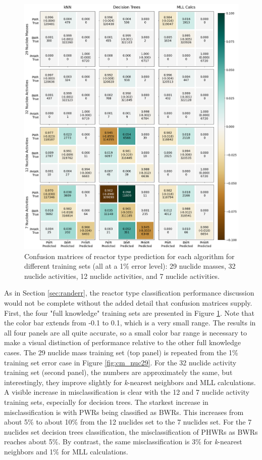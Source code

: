 \begin{figure}[!htbp]
  \centering
  \includegraphics[width=\textwidth]{./chapters/exp2/confusion_matrix_nucs_acts.png}
  \caption{Confusion matrices of reactor type prediction for each algorithm 
           for different training sets (all at a 1\% error level): 29 nuclide 
           masses, 32 nuclide activities, 12 nuclide activities, and 7 nuclide 
           activities.}
  \label{fig:cm_nucs_acts}
\end{figure}

As in Section \ref{sec:randerr}, the reactor type classification performance
discussion would not be complete without the added detail that confusion
matrices supply. First, the four "full knowledge" training sets are presented
in Figure \ref{fig:cm_nucs_acts}.  Note that the color bar extends from -0.1 to
0.1, which is a very small range.  The results in all four panels are all quite
accurate, so a small color bar range is necessary to make a visual distinction
of performance relative to the other full knowledge cases.  The 29 nuclide mass
training set (top panel) is repeated from the 1\% training set error case in
Figure \ref{fig:cm_nuc29}.  For the 32 nuclide activity training set (second
panel), the numbers are approximately the same, but interestingly, they improve
slightly for \textit{k}-nearest neighbors and \gls{MLL} calculations.  A
visible increase in misclassification is clear with the 12 and 7 nuclide
activity training sets, especially for decision trees. The starkest increase in
misclassification is with \gls{PWR}s being classified as \gls{BWR}s. This
increases from about 5\% to about 10\% from the 12 nuclides set to the 7
nuclides set. For the 7 nuclides set decision trees classification, the
misclassification of \gls{PHWR}s as \gls{BWR}s reaches about 5\%. By contrast,
the same misclassification is 3\% for \textit{k}-nearest neighbors and 1\% for
\gls{MLL} calculations. 

